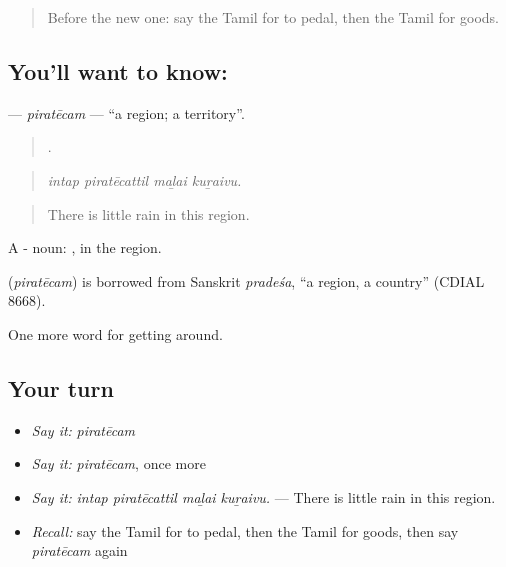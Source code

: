\label{lesson:TA-C452-piratecam}



\begin{quote}
Before the new one: say the Tamil for to pedal, then the Tamil for goods.
\end{quote}

\subsection*{You'll want to know: }
\textbf{} — \emph{piratēcam} — \textquotedblleft{}a region; a territory\textquotedblright{}.

\begin{quote}
   .
\end{quote}

\begin{quote}
\emph{intap piratēcattil maḻai kuṟaivu.}
\end{quote}

\begin{quote}
There is little rain in this region.
\end{quote}

A - noun: , in the region.

\begin{cousinweb}
\textbf{} (\emph{piratēcam}) is borrowed from Sanskrit \emph{pradeśa}, \textquotedblleft{}a region, a country\textquotedblright{} (CDIAL 8668).
\end{cousinweb}

\begin{grammarlens}[title={What you've built}]
One more word for getting around.
\end{grammarlens}

\subsection*{Your turn}
\begin{itemize}
\raggedright
  \item \emph{Say it:} \emph{piratēcam}
  \item \emph{Say it:} \emph{piratēcam}, once more
  \item \emph{Say it:} \emph{intap piratēcattil maḻai kuṟaivu.} — There is little rain in this region.
  \item \emph{Recall:} say the Tamil for to pedal, then the Tamil for goods, then say \emph{piratēcam} again
\end{itemize}


